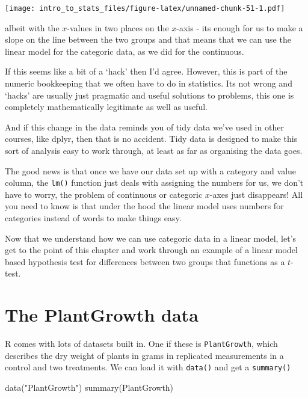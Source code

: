 \documentclass[
]{book}
\newenvironment{Shaded}{\begin{snugshade}}{\end{snugshade}}
\newcommand{\FunctionTok}[1]{\textcolor[rgb]{0.00,0.00,0.00}{#1}}
\newcommand{\NormalTok}[1]{#1}
\newcommand{\StringTok}[1]{\textcolor[rgb]{0.31,0.60,0.02}{#1}}
\begin{document}
\texttt{[image: intro\_to\_stats\_files/figure-latex/unnamed-chunk-51-1.pdf]}

albeit with the \(x\)-values in two places on the \(x\)-axis - its enough for us to make a slope on the line between the two groups and that means that we can use the linear model for the categoric data, as we did for the continuous.

If this seems like a bit of a `hack' then I'd agree. However, this is part of the numeric bookkeeping that we often have to do in statistics. Its not wrong and `hacks' are usually just pragmatic and useful solutions to problems, this one is completely mathematically legitimate as well as useful.

And if this change in the data reminds you of tidy data we've used in other courses, like dplyr, then that is no accident. Tidy data is designed to make this sort of analysis easy to work through, at least as far as organising the data goes.

The good news is that once we have our data set up with a category and value column, the \texttt{lm()} function just deals with assigning the numbers for us, we don't have to worry, the problem of continuous or categoric \(x\)-axes just disappears! All you need to know is that under the hood the linear model uses numbers for categories instead of words to make things easy.

Now that we understand how we can use categoric data in a linear model, let's get to the point of this chapter and work through an example of a linear model based hypothesis test for differences between two groups that functions as a \(t\)-test.

\hypertarget{the-plantgrowth-data}{%
\section{The PlantGrowth data}\label{the-plantgrowth-data}}

R comes with lots of datasets built in. One if these is \texttt{PlantGrowth}, which describes the dry weight of plants in grams in replicated measurements in a control and two treatments. We can load it with \texttt{data()} and get a \texttt{summary()}

\begin{Shaded}
\begin{Highlighting}[]
\FunctionTok{data}\NormalTok{(}\StringTok{"PlantGrowth"}\NormalTok{)}
\FunctionTok{summary}\NormalTok{(PlantGrowth)}
\end{Highlighting}
\end{Shaded}
\end{document}
